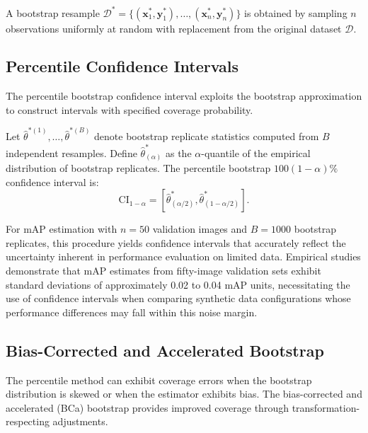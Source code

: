 \begin{definition}
A bootstrap resample $\mathcal{D}^* = \{(\mathbf{x}_1^*, \mathbf{y}_1^*), \ldots, (\mathbf{x}_n^*, \mathbf{y}_n^*)\}$ is obtained by sampling $n$ observations uniformly at random with replacement from the original dataset $\mathcal{D}$.
\end{definition}

\subsection{Percentile Confidence Intervals}

The percentile bootstrap confidence interval exploits the bootstrap approximation to construct intervals with specified coverage probability.

\begin{theorem}
\label{thm:percentile_bootstrap}
Let $\hat{\theta}^{*(1)}, \ldots, \hat{\theta}^{*(B)}$ denote bootstrap replicate statistics computed from $B$ independent resamples. Define $\hat{\theta}^*_{(\alpha)}$ as the $\alpha$-quantile of the empirical distribution of bootstrap replicates. The percentile bootstrap $100(1-\alpha)\%$ confidence interval is:
\begin{equation}
\text{CI}_{1-\alpha} = \left[\hat{\theta}^*_{(\alpha/2)}, \hat{\theta}^*_{(1-\alpha/2)}\right].
\end{equation}
\end{theorem}

For mAP estimation with $n = 50$ validation images and $B = 1000$ bootstrap replicates, this procedure yields confidence intervals that accurately reflect the uncertainty inherent in performance evaluation on limited data. Empirical studies demonstrate that mAP estimates from fifty-image validation sets exhibit standard deviations of approximately 0.02 to 0.04 mAP units, necessitating the use of confidence intervals when comparing synthetic data configurations whose performance differences may fall within this noise margin.

\subsection{Bias-Corrected and Accelerated Bootstrap}

The percentile method can exhibit coverage errors when the bootstrap distribution is skewed or when the estimator exhibits bias. The bias-corrected and accelerated (BCa) bootstrap provides improved coverage through transformation-respecting adjustments.

